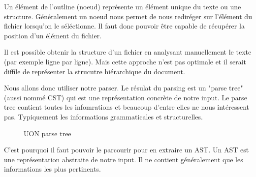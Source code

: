 \documentclass[
    iict, %
    il, %
]{heig-tb}
\begin{document}
Un élément de l'outline (noeud) représente un élément unique du texte ou une structure.
Généralement un noeud nous permet de nous rediréger sur l'élément du fichier lorsqu'on le séléctionne.
Il faut donc pouvoir être capable de récupérer la position d'un élément du fichier.

Il est possible obtenir la structure d'un fichier en analysant manuellement le texte (par exemple ligne par ligne). Mais cette approche n'est pas optimale et il serait diffile de représenter la strucutre hiérarchique du document.

Nous allons donc utiliser notre parser.
Le résulat du parsing est un "parse tree" (aussi nommé CST) qui est une représentation concrète de notre input. Le parse tree contient toutes les infomrations et beaucoup d'entre elles ne nous intéressent pas.
Typiquement les informations grammaticales et structurelles.

\begin{figure}[!h]
    \begin{center}
    \end{center}
    \caption[UON parse tree]{\label{parse-tree} UON parse tree}
\end{figure}

C'est pourquoi il faut pouvoir le parcourir pour en extraire un AST.
Un AST est une représentation abstraite de notre input. Il ne contient généralement que les informations les plus pertinents.
\end{document}
